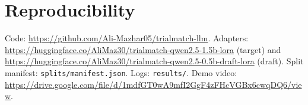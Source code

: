 \documentclass[conference]{IEEEtran}
\begin{document}
\section{Reproducibility}
Code: \url{https://github.com/Ali-Mazhar05/trialmatch-llm}. Adapters: \url{https://huggingface.co/AliMaz30/trialmatch-qwen2.5-1.5b-lora} (target) and \url{https://huggingface.co/AliMaz30/trialmatch-qwen2.5-0.5b-draft-lora} (draft). Split manifest: \texttt{splits/manifest.json}. Logs: \texttt{results/}. Demo video: \url{https://drive.google.com/file/d/1mdfGT0wA9mfI2GgF4zFHcVGBx6cwqDQ6/view}.



\end{document}
